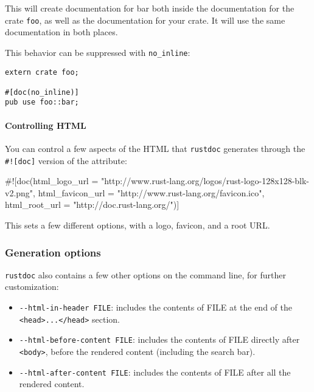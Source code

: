 \documentclass[a4paper,]{book}
\newenvironment{Shaded}{\begin{snugshade}}{\end{snugshade}}
\newcommand{\StringTok}[1]{\textcolor[rgb]{0.31,0.60,0.02}{{#1}}}
\newcommand{\AttributeTok}[1]{\textcolor[rgb]{0.77,0.63,0.00}{{#1}}}
\newcommand{\NormalTok}[1]{{#1}}
\providecommand{\tightlist}{%
  \setlength{\itemsep}{0pt}\setlength{\parskip}{0pt}}
\let\oldparagraph\paragraph
\renewcommand{\paragraph}[1]{\oldparagraph{#1}\mbox{}}
\begin{document}
This will create documentation for bar both inside the documentation for
the crate \texttt{foo}, as well as the documentation for your crate. It
will use the same documentation in both places.

This behavior can be suppressed with \texttt{no\_inline}:

\begin{verbatim}
extern crate foo;

#[doc(no_inline)]
pub use foo::bar;
\end{verbatim}

\paragraph{Controlling HTML}\label{controlling-html}

You can control a few aspects of the HTML that \texttt{rustdoc}
generates through the \texttt{\#!{[}doc{]}} version of the attribute:

\begin{Shaded}
\begin{Highlighting}[]
\AttributeTok{#![}\NormalTok{doc}\AttributeTok{(}\NormalTok{html_logo_url }\AttributeTok{=} \StringTok{"http://www.rust-lang.org/logos/rust-logo-128x128-blk-v2.png"}\AttributeTok{,}
       \NormalTok{html_favicon_url }\AttributeTok{=} \StringTok{"http://www.rust-lang.org/favicon.ico"}\AttributeTok{,}
       \NormalTok{html_root_url }\AttributeTok{=} \StringTok{"http://doc.rust-lang.org/"}\AttributeTok{)]}
\end{Highlighting}
\end{Shaded}

This sets a few different options, with a logo, favicon, and a root URL.

\subsubsection{Generation options}\label{generation-options}

\texttt{rustdoc} also contains a few other options on the command line,
for further customization:

\begin{itemize}
\tightlist
\item
  \texttt{-\/-html-in-header\ FILE}: includes the contents of FILE at
  the end of the
  \texttt{\textless{}head\textgreater{}...\textless{}/head\textgreater{}}
  section.
\item
  \texttt{-\/-html-before-content\ FILE}: includes the contents of FILE
  directly after \texttt{\textless{}body\textgreater{}}, before the
  rendered content (including the search bar).
\item
  \texttt{-\/-html-after-content\ FILE}: includes the contents of FILE
  after all the rendered content.
\end{itemize}
\end{document}
